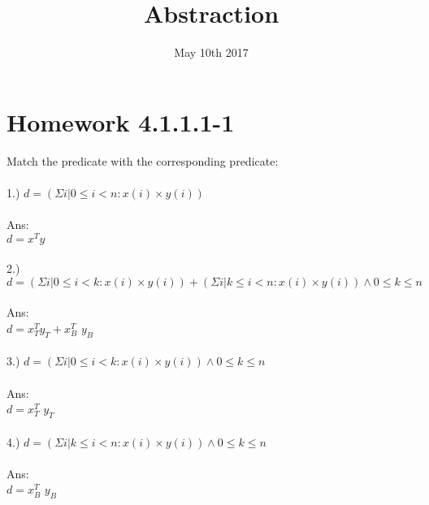 \documentclass{article}
\title{Abstraction}
\date{May 10th 2017}
\begin{document}
\maketitle

\section{Homework 4.1.1.1-1}
Match the predicate with the corresponding predicate:
\\
\\
1.) $d = (\Sigma i | 0 \leq i < n : x(i) \times y(i))$
\\
\\
Ans:
\\
$d = x^{T}y$
\\
\\
2.) $d = (\Sigma i | 0 \leq i < k : x(i) \times y(i)) + (\Sigma i | k \leq i < n : x(i) \times y(i)) \land 0 \leq k \leq n$
\\
\\
Ans:
\\
$d = x^{T}_{T} y_{T} + x^{T}_{B}$ $y_{B}$
\\
\\
3.) $d = (\Sigma i | 0 \leq i < k : x(i) \times y(i)) \land 0 \leq k \leq n$
\\
\\
Ans:
\\
$d = x^{T}_{T}$ $y_{T}$
\\
\\
4.) $d = (\Sigma i | k \leq i < n : x(i) \times y(i)) \land 0 \leq k \leq n$
\\
\\
Ans:
\\
$d = x^{T}_{B}$ $y_{B}$
\\
\\
\\
\\
\\
\\
\\
\\
\end{document}
